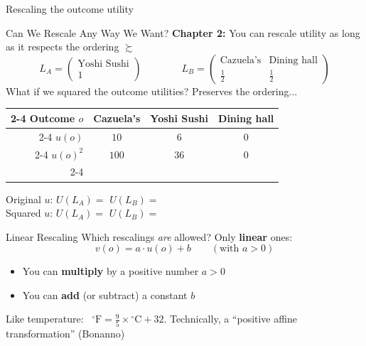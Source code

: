 
\begin{frame}[standout]
Rescaling the outcome utility
\end{frame}

\begin{frame}{Can We Rescale Any Way We Want?}
\textbf{Chapter 2:} You can rescale utility as long as it respects the ordering $\succsim$
\bsk
$$L_A=\begin{pmatrix} \text{Yoshi Sushi} \\[2pt] 1\end{pmatrix}
\qquad\qquad
L_B=\begin{pmatrix} \text{Cazuela's} & \text{Dining hall} \\[2pt] \tfrac12 & \tfrac12\end{pmatrix}$$
\bsk
What if we squared the outcome utilities? Preserves the ordering...

\centering
\begin{tabular}{r|c|c|c|}
\cline{2-4}
Outcome $o$ & Cazuela's & Yoshi Sushi & Dining hall \\
\cline{2-4}
$u(o)$ & $10$ & $6$ & $0$ \\
\cline{2-4}
$u(o)^2$ & $100$ & $36$ & $0$ \\
\cline{2-4}
\end{tabular}
\bsk
\raggedright
Original $u$: \hspace{0.15in} $U(L_A)=$ \hspace{1.6in} $U(L_B)=$\\
Squared $u$: \hspace{0.15in} $U(L_A)=$ \hspace{1.6in} $U(L_B)=$
\bsk
{}
\vspace{-0.3in}
\end{frame}

\begin{frame}{Linear Rescaling}
Which rescalings \textit{are} allowed? Only \textbf{linear} ones:
$$v(o)=a\cdot u(o)+b \qquad (\text{with } a>0)$$
\begin{itemize}
    \item You can \textbf{multiply} by a positive number $a>0$
    \item You can \textbf{add} (or subtract) a constant $b$
\end{itemize}
\bsk
Like temperature: \ ${}^\circ\text{F} = \frac{9}{5}\times{}^\circ\text{C}+32$.
\vfill
{\footnotesize Technically, a ``positive affine transformation'' (Bonanno)}
\vspace{-0.2in}
\end{frame}

